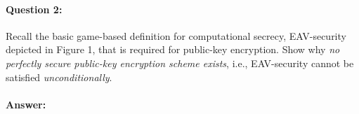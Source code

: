 \documentclass{article}
\begin{document}
    \paragraph{Question 2:} Recall the basic game-based definition for computational secrecy, EAV-security depicted in Figure 1, that is required for public-key encryption. Show why \emph{no perfectly secure public-key encryption scheme exists}, i.e., EAV-security cannot be satisfied \emph{unconditionally}.
    \paragraph{Answer: \newline}
    

        
    


\end{document}
